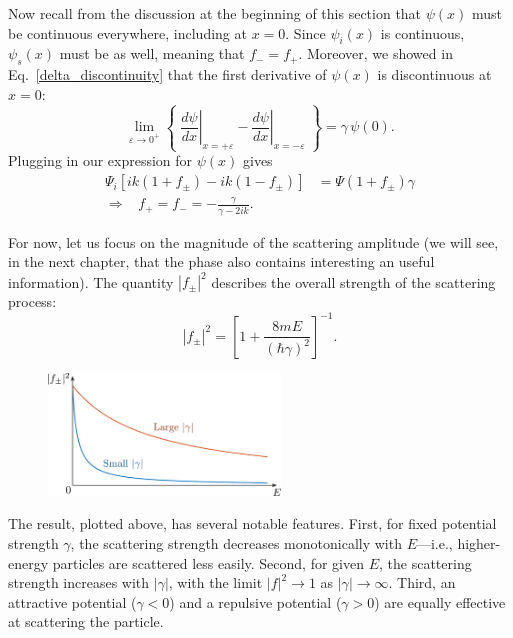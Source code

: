 \documentclass[pra,12pt]{revtex4}
\begin{document}
Now recall from the discussion at the beginning of this section that
$\psi(x)$ must be continuous everywhere, including at $x = 0$.  Since
$\psi_i(x)$ is continuous, $\psi_s(x)$ must be as well, meaning that
$f_- = f_+$.  Moreover, we showed in Eq.~\eqref{delta_discontinuity}
that the first derivative of $\psi(x)$ is discontinuous at $x=0$:
\begin{equation}
  \lim_{\varepsilon\rightarrow 0^+} \left\{\; \left.\frac{d\psi}{dx}\right|_{x = +\varepsilon} - \left.\frac{d\psi}{dx}\right|_{x = -\varepsilon}\; \right\}  =  \gamma\, \psi(0).
\end{equation}
Plugging in our expression for $\psi(x)$ gives
\begin{equation}
  \begin{aligned}\Psi_i\left[ik(1+f_\pm) - ik(1-f_\pm)\right]  &=  \Psi(1+f_\pm) \gamma \\ \Rightarrow \;\;\; f_+ = f_- = -\frac{\gamma}{\gamma - 2ik}.\end{aligned}
\end{equation}

For now, let us focus on the magnitude of the scattering amplitude (we
will see, in the next chapter, that the phase also contains
interesting an useful information).  The quantity $|f_\pm|^2$
describes the overall strength of the scattering process:
\begin{equation}
  |f_\pm|^2 = \left[1 + \frac{8mE}{(\hbar\gamma)^2}\right]^{-1}.
\end{equation}

\begin{figure}[h]
  \centering\includegraphics[width=0.55\textwidth]{scattering1df}
\end{figure}

The result, plotted above, has several notable features.  First, for
fixed potential strength $\gamma$, the scattering strength decreases
monotonically with $E$---i.e., higher-energy particles are scattered
less easily.  Second, for given $E$, the scattering strength increases
with $|\gamma|$, with the limit $|f|^2 \rightarrow 1$ as
$|\gamma|\rightarrow \infty$.  Third, an attractive potential ($\gamma
< 0$) and a repulsive potential ($\gamma > 0$) are equally effective
at scattering the particle.
\end{document}
